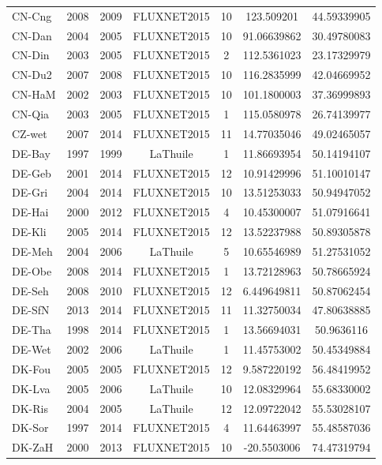 \begin{center}
\begin{longtable}{lcccccc}
CN-Cng & 2008 & 2009 & FLUXNET2015 & 10     & 123.509201   & 44.59339905  \\
CN-Dan & 2004 & 2005 & FLUXNET2015 & 10     & 91.06639862  & 30.49780083  \\
CN-Din & 2003 & 2005 & FLUXNET2015 & 2      & 112.5361023  & 23.17329979  \\
CN-Du2 & 2007 & 2008 & FLUXNET2015 & 10     & 116.2835999  & 42.04669952  \\
CN-HaM & 2002 & 2003 & FLUXNET2015 & 10     & 101.1800003  & 37.36999893  \\
CN-Qia & 2003 & 2005 & FLUXNET2015 & 1      & 115.0580978  & 26.74139977  \\
CZ-wet & 2007 & 2014 & FLUXNET2015 & 11     & 14.77035046  & 49.02465057  \\
DE-Bay & 1997 & 1999 & LaThuile    & 1      & 11.86693954  & 50.14194107  \\
DE-Geb & 2001 & 2014 & FLUXNET2015 & 12     & 10.91429996  & 51.10010147  \\
DE-Gri & 2004 & 2014 & FLUXNET2015 & 10     & 13.51253033  & 50.94947052  \\
DE-Hai & 2000 & 2012 & FLUXNET2015 & 4      & 10.45300007  & 51.07916641  \\
DE-Kli & 2005 & 2014 & FLUXNET2015 & 12     & 13.52237988  & 50.89305878  \\
DE-Meh & 2004 & 2006 & LaThuile    & 5      & 10.65546989  & 51.27531052  \\
DE-Obe & 2008 & 2014 & FLUXNET2015 & 1      & 13.72128963  & 50.78665924  \\
DE-Seh & 2008 & 2010 & FLUXNET2015 & 12     & 6.449649811  & 50.87062454  \\
DE-SfN & 2013 & 2014 & FLUXNET2015 & 11     & 11.32750034  & 47.80638885  \\
DE-Tha & 1998 & 2014 & FLUXNET2015 & 1      & 13.56694031  & 50.9636116   \\
DE-Wet & 2002 & 2006 & LaThuile    & 1      & 11.45753002  & 50.45349884  \\
DK-Fou & 2005 & 2005 & FLUXNET2015 & 12     & 9.587220192  & 56.48419952  \\
DK-Lva & 2005 & 2006 & LaThuile    & 10     & 12.08329964  & 55.68330002  \\
DK-Ris & 2004 & 2005 & LaThuile    & 12     & 12.09722042  & 55.53028107  \\
DK-Sor & 1997 & 2014 & FLUXNET2015 & 4      & 11.64463997  & 55.48587036  \\
DK-ZaH & 2000 & 2013 & FLUXNET2015 & 10     & -20.5503006  & 74.47319794  \\

\end{longtable}
\end{center}

